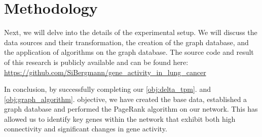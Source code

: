 \section{Methodology} \label{sec:methodology}
Next, we will delve into the details of the experimental setup.
We will discuss the data sources and their transformation, the creation of the graph database,
and the application of algorithms on the graph database.
The source code and result of this research is publicly available and can be found here:\\
\url{https://github.com/SiBergmann/gene_activity_in_lung_cancer}










In conclusion, by successfully completing our \ref{obj:delta_tpm}. and \ref{obj:graph_algorithm}. objective,
we have created the base data, established a graph database and performed the PageRank algorithm on our network.
This has allowed us to identify key genes within the network that exhibit both high connectivity
and significant changes in gene activity.
